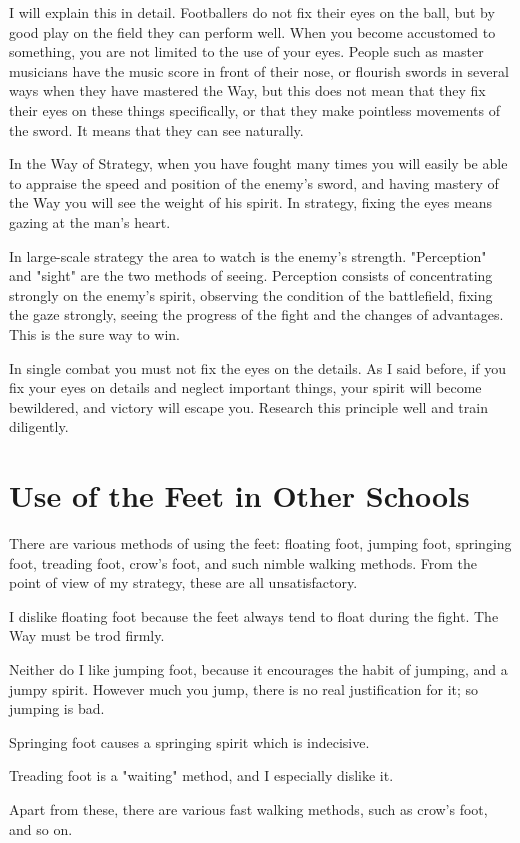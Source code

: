 \documentclass[12pt]{report}
\begin{document}
I will explain this in detail. Footballers do not fix their eyes on the ball, but by good play on the field they can perform well. When you become accustomed to something, you are not limited to the use of your eyes. People such as master musicians have the music score in front of their nose, or flourish swords in several ways when they have mastered the Way, but this does not mean that they fix their eyes on these things specifically, or that they make pointless movements of the sword. It means that they can see naturally.

In the Way of Strategy, when you have fought many times you will easily be able to appraise the speed and position of the enemy's sword, and having mastery of the Way you will see the weight of his spirit. In strategy, fixing the eyes means gazing at the man's heart.

In large-scale strategy the area to watch is the enemy's strength. "Perception" and "sight" are the two methods of seeing. Perception consists of concentrating strongly on the enemy's spirit, observing the condition of the battlefield, fixing the gaze strongly, seeing the progress of the fight and the changes of advantages. This is the sure way to win.

In single combat you must not fix the eyes on the details. As I said before, if you fix your eyes on details and neglect important things, your spirit will become bewildered, and victory will escape you. Research this principle well and train diligently.
\section*{Use of the Feet in Other Schools}
There are various methods of using the feet: floating foot, jumping foot, springing foot, treading foot, crow's foot, and such nimble walking methods. From the point of view of my strategy, these are all unsatisfactory.

I dislike floating foot because the feet always tend to float during the fight. The Way must be trod firmly.

Neither do I like jumping foot, because it encourages the habit of jumping, and a jumpy spirit. However much you jump, there is no real justification for it; so jumping is bad.

Springing foot causes a springing spirit which is indecisive.

Treading foot is a "waiting" method, and I especially dislike it.

Apart from these, there are various fast walking methods, such as crow's foot, and so on.
\end{document}
